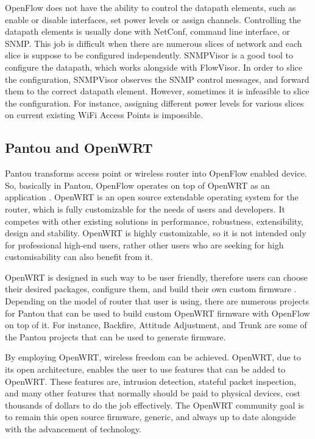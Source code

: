 \documentclass[english]{tktltiki2}
\theoremstyle{definition}
\theoremstyle{remark}
\begin{document}
OpenFlow does not have the ability to control the datapath elements, such as enable or disable interfaces, set power levels or assign channels. Controlling the datapath elements is usually done with NetConf, command line interface, or SNMP. This job is difficult when there are numerous slices of network and each slice is suppose to be configured independently. SNMPVisor is a good tool to configure the datapath, which works alongside with FlowVisor. In order to slice the configuration, SNMPVisor observes the SNMP control messages, and forward them to the correct datapath element. However, sometimes it is infeasible to slice the configuration. For instance, assigning different power levels for various slices on current existing WiFi Access Points is impossible. 

\subsection{Pantou and OpenWRT}

Pantou transforms access point or wireless router into OpenFlow enabled device. So, basically in Pantou, OpenFlow operates on top of OpenWRT as an application \cite{Yia04}. OpenWRT is an open source extendable operating system for the router, which is fully customizable for the needs of users and developers. It competes with other existing solutions in performance, robustness, extensibility, design and stability. OpenWRT is highly customizable, so it is not intended only for professional high-end users, rather other users who are seeking for high customisability can also benefit from it.  \cite{Lor14}

OpenWRT is designed in such way to be user friendly, therefore users can choose their desired packages, configure them, and build their own custom firmware \cite{Lor14}. Depending on the model of router that user is using, there are numerous projects for Pantou that can be used to build custom OpenWRT firmware with OpenFlow on top of it. For instance, Backfire, Attitude Adjustment, and Trunk are some of the Pantou projects that can be used to generate firmware. \cite{Sve14}

By employing OpenWRT, wireless freedom can be achieved. OpenWRT, due to its open architecture, enables the user to use features that can be added to OpenWRT. These features are, intrusion detection, stateful packet inspection, and many other features that normally should be paid to physical devices, cost thousands of dollars to do the job effectively. The OpenWRT community goal is to remain this open source firmware, generic, and always up to date alongside with the advancement of technology. 
\end{document}
